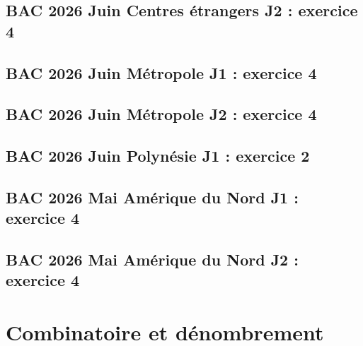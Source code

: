 \documentclass[lang=fr,edition=teacher,layout=sheet]{mxbook}
\begin{document}
\begingroup\endgroup
\par\bigskip
{}\subsection*{BAC 2026 Juin Centres étrangers J2 : exercice 4}
\begingroup\endgroup
\par\bigskip
{}\subsection*{BAC 2026 Juin Métropole J1 : exercice 4}
\begingroup\endgroup
\par\bigskip
{}\subsection*{BAC 2026 Juin Métropole J2 : exercice 4}
\begingroup\endgroup
\par\bigskip
{}\subsection*{BAC 2026 Juin Polynésie J1 : exercice 2}
\begingroup\endgroup
\par\bigskip
{}\subsection*{BAC 2026 Mai Amérique du Nord J1 : exercice 4}
\begingroup\endgroup
\par\bigskip
{}\subsection*{BAC 2026 Mai Amérique du Nord J2 : exercice 4}
\begingroup\endgroup
\par\bigskip
\clearpage\section*{Combinatoire et dénombrement}
\end{document}
